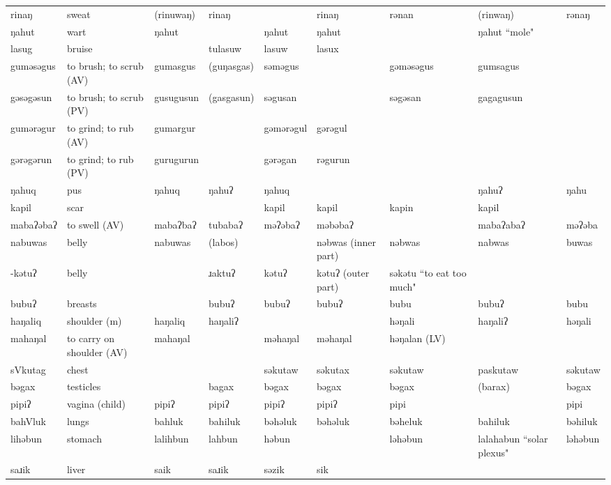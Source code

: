 \begin{landscape}
\begin{longtable}{*{9}{>{\raggedright\arraybackslash}p{}}}
\text{*}rinaŋ & sweat & (rinuwaŋ) & rinaŋ &  & rinaŋ & rənan & (rinwaŋ) & rənaŋ\\
\text{*}ŋahut & wart & ŋahut &  & ŋahut & ŋahut &  & ŋahut ``mole" & \\
\text{*}lasug & bruise &  & tulasuw & lasuw & lasux &  &  & \\
\text{*}guməsəgus & to brush; to scrub (AV) & gumasgus & (guŋasgas) & səməgus &  & gəməsəgus & gumsagus & \\
\text{*}gəsəgəsun & to brush; to scrub (PV) & gusugusun & (gasgasun) & səgusan &  & səgəsan & gagagusun & \\
\text{*}gumərəgur & to grind; to rub (AV) & gumargur &  & gəmərəgul & gərəgul &  &  & \\
\text{*}gərəgərun & to grind; to rub (PV) & gurugurun &  & gərəgan & rəgurun &  &  & \\
\text{*}ŋahuq & pus & ŋahuq & ŋahuʔ & ŋahuq &  &  & ŋahuʔ & ŋahu\\
\text{*}kapil & scar &  &  & kapil & kapil & kapin & kapil & \\
\text{*}mabaʔəbaʔ & to swell (AV) & mabaʔbaʔ & tubabaʔ & məʔəbaʔ & məbəbaʔ &  & mabaʔabaʔ & məʔəba\\
\text{*}nabuwas & belly & nabuwas & (labos) &  & nəbwas (inner part) & nəbwas & nabwas & buwas\\
\text{*}-kətuʔ & belly &  & ɹaktuʔ & kətuʔ & kətuʔ (outer part) & səkətu ``to eat too much" &  & \\
\text{*}bubuʔ & breasts &  & bubuʔ & bubuʔ & bubuʔ & bubu & bubuʔ & bubu\\
\text{*}haŋaliq & shoulder (m) & haŋaliq & haŋaliʔ &  &  & həŋali & haŋaliʔ & həŋali\\
\text{*}mahaŋal & to carry on shoulder (AV) & mahaŋal &  & məhaŋal & məhaŋal & həŋalan (LV) &  & \\
\text{*}sVkutag & chest &  &  & səkutaw & səkutax & səkutaw & paskutaw & səkutaw\\
\text{*}bəgax & testicles &  & bagax & bəgax & bəgax & bəgax & (barax) & bəgax\\
\text{*}pipiʔ & vagina (child) & pipiʔ & pipiʔ & pipiʔ & pipiʔ & pipi &  & pipi\\
\text{*}bahVluk & lungs & bahluk & bahiluk & bəhəluk & bəhəluk & bəheluk & bahiluk & bəhiluk\\
\text{*}lihəbun & stomach & lalihbun & lahbun & həbun &  & ləhəbun & lalahabun ``solar plexus" & ləhəbun\\
\text{*}saɹik & liver & saik & saɹik & səzik & sik &  &  & \\

\end{longtable}
\end{landscape}
